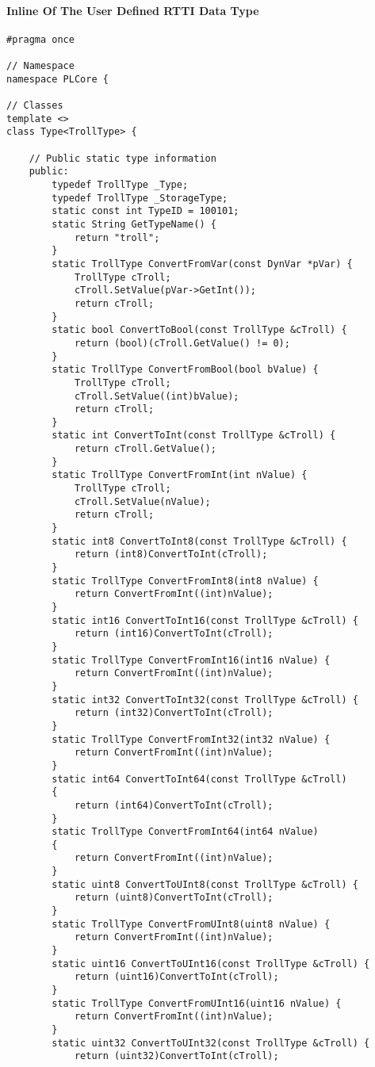\paragraph{Inline Of The User Defined RTTI Data Type}
\begin{lstlisting}[label=Code:UserDefinedRTTIDataTypeInline,caption={Inline of the user defined RTTI data type}]
#pragma once

// Namespace
namespace PLCore {

// Classes
template <>
class Type<TrollType> {

	// Public static type information
	public:
		typedef TrollType _Type;
		typedef TrollType _StorageType;
		static const int TypeID = 100101;
		static String GetTypeName() {
			return "troll";
		}
		static TrollType ConvertFromVar(const DynVar *pVar) {
			TrollType cTroll;
			cTroll.SetValue(pVar->GetInt());
			return cTroll;
		}
		static bool ConvertToBool(const TrollType &cTroll) {
			return (bool)(cTroll.GetValue() != 0);
		}
		static TrollType ConvertFromBool(bool bValue) {
			TrollType cTroll;
			cTroll.SetValue((int)bValue);
			return cTroll;
		}
		static int ConvertToInt(const TrollType &cTroll) {
			return cTroll.GetValue();
		}
		static TrollType ConvertFromInt(int nValue) {
			TrollType cTroll;
			cTroll.SetValue(nValue);
			return cTroll;
		}
		static int8 ConvertToInt8(const TrollType &cTroll) {
			return (int8)ConvertToInt(cTroll);
		}
		static TrollType ConvertFromInt8(int8 nValue) {
			return ConvertFromInt((int)nValue);
		}
		static int16 ConvertToInt16(const TrollType &cTroll) {
			return (int16)ConvertToInt(cTroll);
		}
		static TrollType ConvertFromInt16(int16 nValue) {
			return ConvertFromInt((int)nValue);
		}
		static int32 ConvertToInt32(const TrollType &cTroll) {
			return (int32)ConvertToInt(cTroll);
		}
		static TrollType ConvertFromInt32(int32 nValue) {
			return ConvertFromInt((int)nValue);
		}
		static int64 ConvertToInt64(const TrollType &cTroll)
		{
			return (int64)ConvertToInt(cTroll);
		}
		static TrollType ConvertFromInt64(int64 nValue)
		{
			return ConvertFromInt((int)nValue);
		}
		static uint8 ConvertToUInt8(const TrollType &cTroll) {
			return (uint8)ConvertToInt(cTroll);
		}
		static TrollType ConvertFromUInt8(uint8 nValue) {
			return ConvertFromInt((int)nValue);
		}
		static uint16 ConvertToUInt16(const TrollType &cTroll) {
			return (uint16)ConvertToInt(cTroll);
		}
		static TrollType ConvertFromUInt16(uint16 nValue) {
			return ConvertFromInt((int)nValue);
		}
		static uint32 ConvertToUInt32(const TrollType &cTroll) {
			return (uint32)ConvertToInt(cTroll);

\end{lstlisting}
